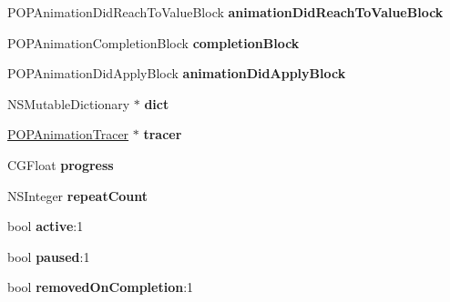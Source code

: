 \begin{DoxyCompactItemize}
P\+O\+P\+Animation\+Did\+Reach\+To\+Value\+Block {\bfseries animation\+Did\+Reach\+To\+Value\+Block}
\item 
\mbox{\label{struct___p_o_p_animation_state_adace6900fcf9fe06da36c7c23b87ea6f}} 
P\+O\+P\+Animation\+Completion\+Block {\bfseries completion\+Block}
\item 
\mbox{\label{struct___p_o_p_animation_state_a65681635c8f33480c8575197e215b60b}} 
P\+O\+P\+Animation\+Did\+Apply\+Block {\bfseries animation\+Did\+Apply\+Block}
\item 
\mbox{\label{struct___p_o_p_animation_state_a68119fd69f9907c3f1a5556c935f7285}} 
N\+S\+Mutable\+Dictionary $\ast$ {\bfseries dict}
\item 
\mbox{\label{struct___p_o_p_animation_state_ac4de4988df99cf33a73d7aa2952ac3ca}} 
\mbox{\hyperlink{interface_p_o_p_animation_tracer}{P\+O\+P\+Animation\+Tracer}} $\ast$ {\bfseries tracer}
\item 
\mbox{\label{struct___p_o_p_animation_state_aefcceb9472739817512b7b54f7aa1957}} 
C\+G\+Float {\bfseries progress}
\item 
\mbox{\label{struct___p_o_p_animation_state_af580fd01300b5cd9c7b45527307a62ca}} 
N\+S\+Integer {\bfseries repeat\+Count}
\item 
\mbox{\label{struct___p_o_p_animation_state_a23f12e78cfe742ea46523fe3e762b314}} 
bool {\bfseries active}\+:1
\item 
\mbox{\label{struct___p_o_p_animation_state_ab247e7d508465cf7cfa61e02bb990240}} 
bool {\bfseries paused}\+:1
\item 
\mbox{\label{struct___p_o_p_animation_state_adece6d334d519fead5a8d0b0fa5712cb}} 
bool {\bfseries removed\+On\+Completion}\+:1
\item 
\mbox{\label{struct___p_o_p_animation_state_a524c124d17ead92c560bd3cbba2a07d5}} 

\end{DoxyCompactItemize}
